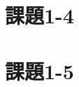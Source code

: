 \documentclass[a4j,11pt]{jarticle}
\begin{document}


\section{課題1-4}








\section{課題1-5}

\end{document}
